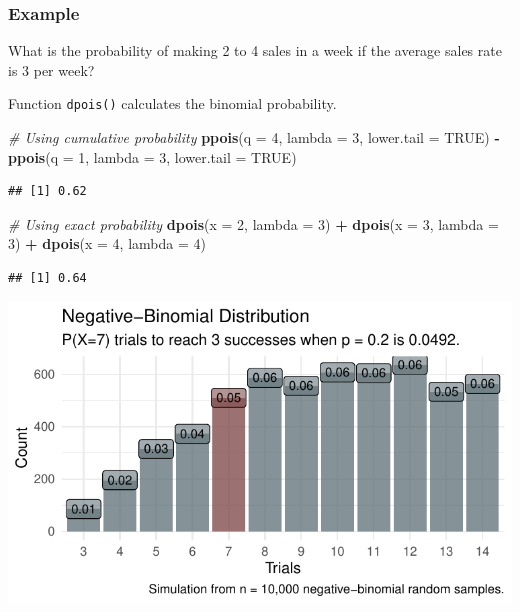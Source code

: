 \documentclass[
]{book}
\newenvironment{Shaded}{\begin{snugshade}}{\end{snugshade}}
\newcommand{\CommentTok}[1]{\textcolor[rgb]{0.56,0.35,0.01}{\textit{#1}}}
\newcommand{\DataTypeTok}[1]{\textcolor[rgb]{0.13,0.29,0.53}{#1}}
\newcommand{\DecValTok}[1]{\textcolor[rgb]{0.00,0.00,0.81}{#1}}
\newcommand{\KeywordTok}[1]{\textcolor[rgb]{0.13,0.29,0.53}{\textbf{#1}}}
\newcommand{\NormalTok}[1]{#1}
\newcommand{\OperatorTok}[1]{\textcolor[rgb]{0.81,0.36,0.00}{\textbf{#1}}}
\newcommand{\OtherTok}[1]{\textcolor[rgb]{0.56,0.35,0.01}{#1}}
\newcommand{\StringTok}[1]{\textcolor[rgb]{0.31,0.60,0.02}{#1}}
\begin{document}
\hypertarget{example-4}{%
\subsubsection*{Example}\label{example-4}}

What is the probability of making 2 to 4 sales in a week if the average sales rate is 3 per week?

Function \texttt{dpois()} calculates the binomial probability.

\begin{Shaded}
\begin{Highlighting}[]
\CommentTok{# Using cumulative probability}
\KeywordTok{ppois}\NormalTok{(}\DataTypeTok{q =} \DecValTok{4}\NormalTok{, }\DataTypeTok{lambda =} \DecValTok{3}\NormalTok{, }\DataTypeTok{lower.tail =} \OtherTok{TRUE}\NormalTok{) }\OperatorTok{-}\StringTok{ }
\StringTok{  }\KeywordTok{ppois}\NormalTok{(}\DataTypeTok{q =} \DecValTok{1}\NormalTok{, }\DataTypeTok{lambda =} \DecValTok{3}\NormalTok{, }\DataTypeTok{lower.tail =} \OtherTok{TRUE}\NormalTok{)}
\end{Highlighting}
\end{Shaded}

\begin{verbatim}
## [1] 0.62
\end{verbatim}

\begin{Shaded}
\begin{Highlighting}[]
\CommentTok{# Using exact probability}
\KeywordTok{dpois}\NormalTok{(}\DataTypeTok{x =} \DecValTok{2}\NormalTok{, }\DataTypeTok{lambda =} \DecValTok{3}\NormalTok{) }\OperatorTok{+}
\StringTok{  }\KeywordTok{dpois}\NormalTok{(}\DataTypeTok{x =} \DecValTok{3}\NormalTok{, }\DataTypeTok{lambda =} \DecValTok{3}\NormalTok{) }\OperatorTok{+}
\StringTok{  }\KeywordTok{dpois}\NormalTok{(}\DataTypeTok{x =} \DecValTok{4}\NormalTok{, }\DataTypeTok{lambda =} \DecValTok{4}\NormalTok{)}
\end{Highlighting}
\end{Shaded}

\begin{verbatim}
## [1] 0.64
\end{verbatim}

\includegraphics{data-sci_files/figure-latex/unnamed-chunk-10-1.pdf}
\end{document}
